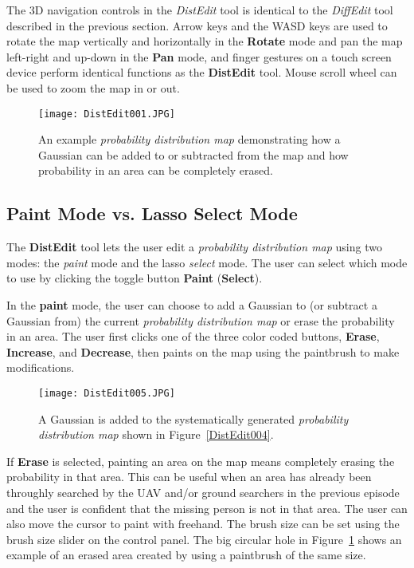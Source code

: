 The 3D navigation controls in the \textit{DistEdit} tool is identical to the \textit{DiffEdit} tool described in the previous section. Arrow keys and the WASD keys are used to rotate the map vertically and horizontally in the \textbf{Rotate} mode and pan the map left-right and up-down in the \textbf{Pan} mode, and finger gestures on a touch screen device perform identical functions as the \textbf{DistEdit} tool. Mouse scroll wheel can be used to zoom the map in or out.

\begin{figure}
\centering
\texttt{[image: DistEdit001.JPG]}
\caption{An example \textit{probability distribution map} demonstrating how a Gaussian can be added to or subtracted from the map and how probability in an area can be completely erased.}
\label{DistEdit001}
\end{figure}

\subsection{Paint Mode vs. Lasso Select Mode}

The \textbf{DistEdit} tool lets the user edit a \textit{probability distribution map} using two modes: the \textit{paint} mode and the lasso \textit{select} mode. The user can select which mode to use by clicking the toggle button \textbf{Paint} (\textbf{Select}). 

In the \textbf{paint} mode, the user can choose to add a Gaussian to (or subtract a Gaussian from) the current \textit{probability distribution map} or erase the probability in an area. The user first clicks one of the three color coded buttons, \textbf{Erase}, \textbf{Increase}, and \textbf{Decrease}, then paints on the map using the paintbrush to make modifications.

\begin{figure}[!ht]
\centering
\texttt{[image: DistEdit005.JPG]}
\caption{A Gaussian is added to the systematically generated \textit{probability distribution map} shown in Figure~\ref{DistEdit004}.}
\label{DistEdit005}
\end{figure}

If \textbf{Erase} is selected, painting an area on the map means completely erasing the probability in that area. This can be useful when an area has already been throughly searched by the UAV and/or ground searchers in the previous episode and the user is confident that the missing person is not in that area. The user can also move the cursor to paint with freehand. The brush size can be set using the brush size slider on the control panel. The big circular hole in Figure~\ref{DistEdit001} shows an example of an erased area created by using a paintbrush of the same size.

